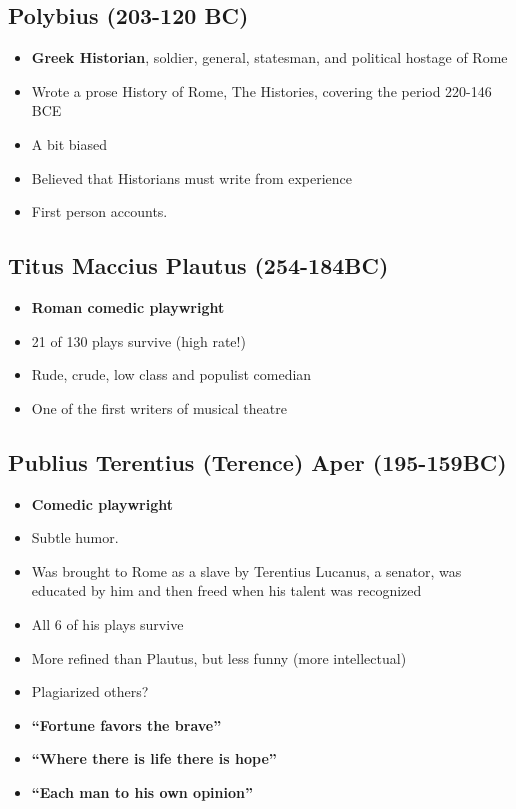 \documentclass[12pt, twoside]{article}
\begin{document}
\subsection{Polybius (203-120 BC)}
\begin{itemize}
\item \textbf{Greek Historian}, soldier, general, statesman, and political hostage of Rome
\item Wrote a prose History of Rome, The Histories, covering the period 220-146 BCE
\item A bit biased
\item Believed that Historians must write from experience
\item First person accounts.
\end{itemize}

\subsection{Titus Maccius Plautus (254-184BC)}
\begin{itemize}
\item \textbf{Roman comedic playwright}
\item 21 of 130 plays survive (high rate!)
\item Rude, crude, low class and populist comedian
\item One of the first writers of musical theatre
\end{itemize}

\subsection{Publius Terentius (Terence) Aper (195-159BC)}
\begin{itemize}
\item \textbf{Comedic playwright}
\item Subtle humor.
\item Was brought to Rome as a slave by Terentius Lucanus, a  senator, was educated by him and then freed when his talent was recognized
\item All 6 of his plays survive
\item More refined than Plautus, but less funny (more intellectual)
\item Plagiarized others?
\item \textbf{“Fortune favors the brave”}
\item \textbf{“Where there is life there is hope”}
\item \textbf{“Each man to his own opinion”}
\end{itemize}
\end{document}
